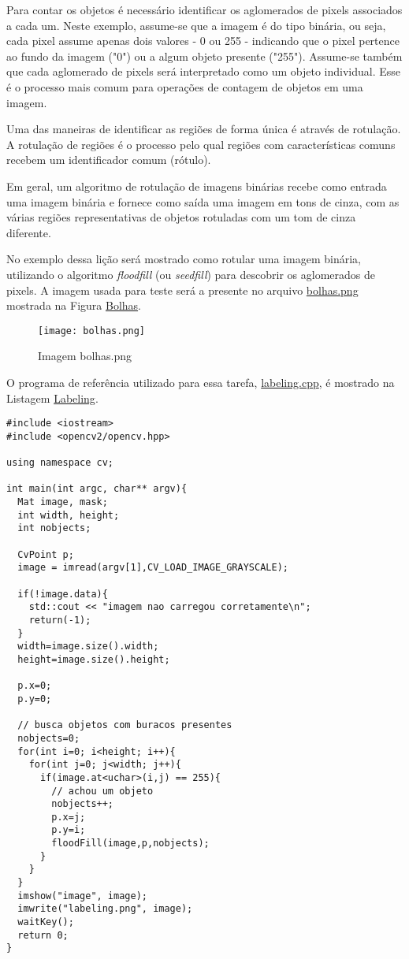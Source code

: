 \documentclass[11pt]{amsbook}
\begin{document}
Para contar os objetos é necessário identificar os aglomerados de
pixels associados a cada um. Neste exemplo, assume-se que a imagem é
do tipo binária, ou seja, cada pixel assume apenas dois valores - 0 ou
255 - indicando que o pixel pertence ao fundo da imagem ("0") ou a
algum objeto presente ("255"). Assume-se também que cada aglomerado de
pixels será interpretado como um objeto individual. Esse é o processo
mais comum para operações de contagem de objetos em uma imagem.


Uma das maneiras de identificar as regiões de forma única é através de
rotulação. A rotulação de regiões é o processo pelo qual regiões com
características comuns recebem um identificador comum (rótulo).


Em geral, um algoritmo de rotulação de imagens binárias recebe como
entrada uma imagem binária e fornece como saída uma imagem em tons de
cinza, com as várias regiões representativas de objetos rotuladas com
um tom de cinza diferente.


No exemplo dessa lição será mostrado como rotular uma imagem binária,
utilizando o algoritmo \emph{floodfill} (ou \emph{seedfill}) para descobrir os
aglomerados de pixels. A imagem usada para teste será a presente no arquivo
\href{figs/bolhas.png}{bolhas.png} mostrada na Figura \hyperlink{fig-bolhas}{Bolhas}.


\begin{figure}[h]{}
\centering\texttt{[image: bolhas.png]}
\caption{Imagem bolhas.png}

\end{figure}

O programa de referência utilizado para essa tarefa,
\href{exemplos/labeling.cpp}{labeling.cpp}, é mostrado na Listagem
\hyperlink{exa-labeling}{Labeling}.


\begin{verbatim}
#include <iostream>
#include <opencv2/opencv.hpp>

using namespace cv;

int main(int argc, char** argv){
  Mat image, mask;
  int width, height;
  int nobjects;

  CvPoint p;
  image = imread(argv[1],CV_LOAD_IMAGE_GRAYSCALE);

  if(!image.data){
    std::cout << "imagem nao carregou corretamente\n";
    return(-1);
  }
  width=image.size().width;
  height=image.size().height;

  p.x=0;
  p.y=0;

  // busca objetos com buracos presentes
  nobjects=0;
  for(int i=0; i<height; i++){
    for(int j=0; j<width; j++){
      if(image.at<uchar>(i,j) == 255){
		// achou um objeto
		nobjects++;
		p.x=j;
		p.y=i;
		floodFill(image,p,nobjects);
	  }
	}
  }
  imshow("image", image);
  imwrite("labeling.png", image);
  waitKey();
  return 0;
}
\end{verbatim}
\end{document}
